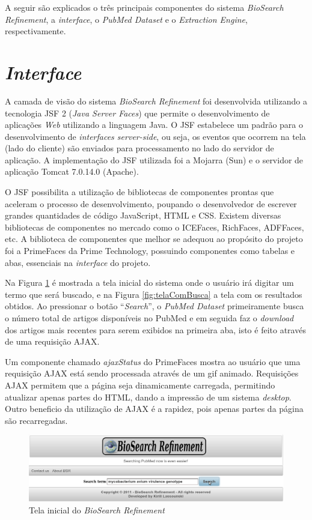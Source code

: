 A seguir são explicados o três principais componentes do sistema \emph{BioSearch Refinement}, a \emph{interface}, o \emph{PubMed Dataset} e o \emph{Extraction Engine}, respectivamente.

\section{\emph{Interface}}

A camada de visão do sistema \emph{BioSearch Refinement} foi desenvolvida utilizando a tecnologia JSF 2 (\emph{Java Server Faces}) que permite o desenvolvimento de aplicações \emph{Web} utilizando a linguagem Java. O JSF estabelece um padrão para o desenvolvimento de \emph{interfaces server-side}, ou seja, os eventos que ocorrem na tela (lado do cliente) são enviados para processamento no lado do servidor de aplicação. A implementação do JSF utilizada foi a Mojarra (Sun) e o servidor de aplicação Tomcat 7.0.14.0 (Apache).

O JSF possibilita a utilização de bibliotecas de componentes prontas que aceleram o processo de desenvolvimento, poupando o desenvolvedor de escrever grandes quantidades de código JavaScript, HTML e CSS. Existem diversas bibliotecas de componentes no mercado como o ICEFaces, RichFaces, ADFFaces, etc. A biblioteca de componentes que melhor se adequou ao propósito do projeto foi a PrimeFaces da Prime Technology, possuindo componentes como tabelas e abas, essenciais na \emph{interface} do projeto.

Na Figura \ref{fig:telaInicial} é mostrada a tela inicial do sistema onde o usuário irá digitar um termo que será buscado, e na Figura \ref{fig:telaComBusca} a tela com os resultados obtidos. Ao pressionar o botão “\emph{Search}”, o \emph{PubMed Dataset} primeiramente busca o número total de artigos disponíveis no PubMed e em seguida faz o \emph{download} dos artigos mais recentes para serem exibidos na primeira aba, isto é feito através de uma requisição AJAX. 

Um componente chamado \emph{ajaxStatus} do PrimeFaces mostra ao usuário que uma requisição AJAX está sendo processada através de um gif animado. Requisições AJAX permitem que a página seja dinamicamente carregada, permitindo atualizar apenas partes do HTML, dando a impressão de um sistema \emph{desktop}. Outro beneficio da utilização de AJAX é a rapidez, pois apenas partes da página são recarregadas.

\begin{figure}[h!]
    \center
    \includegraphics[scale=0.35]{imagens/telaInicial.png}
    \caption{Tela inicial do \emph{BioSearch Refinement} \label{fig:telaInicial}} 
\end{figure}

